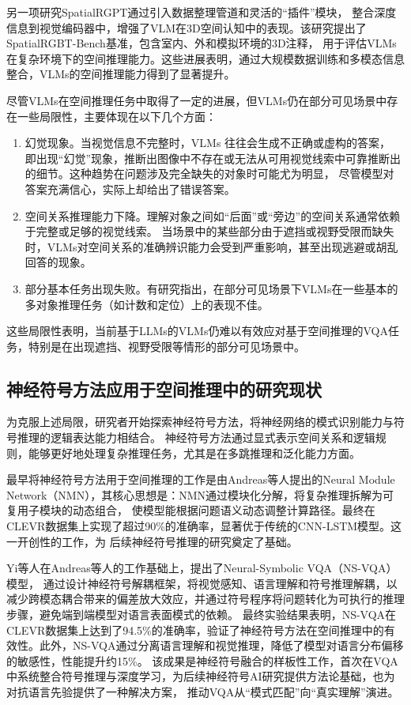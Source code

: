 另一项研究SpatialRGPT\cite{cheng2024spatialrgptgroundedspatialreasoning}通过引入数据整理管道和灵活的“插件”模块，
整合深度信息到视觉编码器中，增强了VLM在3D空间认知中的表现。该研究提出了SpatialRGBT-Bench基准，包含室内、外和模拟环境的3D注释，
用于评估VLMs在复杂环境下的空间推理能力。这些进展表明，通过大规模数据训练和多模态信息整合，VLMs的空间推理能力得到了显著提升。

尽管VLMs在空间推理任务中取得了一定的进展，但VLMs仍在部分可见场景中存在一些局限性，主要体现在以下几个方面：
\begin{enumerate}[nosep]
\item 幻觉现象。当视觉信息不完整时，VLMs 往往会生成不正确或虚构的答案，
即出现“幻觉”现象，推断出图像中不存在或无法从可用视觉线索中可靠推断出的细节。这种趋势在问题涉及完全缺失的对象时可能尤为明显，
尽管模型对答案充满信心，实际上却给出了错误答案\cite{vardi2025clipupclipbasedunanswerableproblem}。
\item 空间关系推理能力下降。理解对象之间如“后面”或“旁边”的空间关系通常依赖于完整或足够的视觉线索。
当场景中的某些部分由于遮挡或视野受限而缺失时，VLMs对空间关系的准确辨识能力会受到严重影响，甚至出现逃避或胡乱回答的现象\cite{chen2024spatialvlmendowingvisionlanguagemodels}。
\item 部分基本任务出现失败。有研究指出，在部分可见场景下VLMs在一些基本的多对象推理任务（如计数和定位）上的表现不佳\cite{campbell2024understandinglimitsvisionlanguage}。
\end{enumerate}

这些局限性表明，当前基于LLMs的VLMs仍难以有效应对基于空间推理的VQA任务，特别是在出现遮挡、视野受限等情形的部分可见场景中。
\subsection{神经符号方法应用于空间推理中的研究现状}
为克服上述局限，研究者开始探索神经符号方法，将神经网络的模式识别能力与符号推理的逻辑表达能力相结合。
神经符号方法通过显式表示空间关系和逻辑规则，能够更好地处理复杂推理任务，尤其是在多跳推理和泛化能力方面。

最早将神经符号方法用于空间推理的工作是由Andreas等人\cite{andreas2016neural}提出的Neural Module Network（NMN），其核心思想是：NMN通过模块化分解，将复杂推理拆解为可复用子模块的动态组合，
使模型能根据问题语义动态调整计算路径。最终在CLEVR数据集上实现了超过90\%的准确率，显著优于传统的CNN-LSTM模型。这一开创性的工作，为
后续神经符号推理的研究奠定了基础。

Yi等人\cite{yi2019neuralsymbolicvqadisentanglingreasoning}在Andreas等人的工作基础上，提出了Neural-Symbolic VQA（NS-VQA）模型，
通过设计神经符号解耦框架，将视觉感知、语言理解和符号推理解耦，以减少跨模态耦合带来的偏差放大效应，并通过符号程序将问题转化为可执行的推理步骤，避免端到端模型对语言表面模式的依赖。
最终实验结果表明，NS-VQA在CLEVR数据集上达到了94.5\%的准确率，验证了神经符号方法在空间推理中的有效性。此外，NS-VQA通过分离语言理解和视觉推理，降低了模型对语言分布偏移的敏感性，性能提升约15\%。
该成果是神经符号融合的样板性工作，首次在VQA中系统整合符号推理与深度学习，为后续神经符号AI研究提供方法论基础，也为对抗语言先验提供了一种解决方案，
推动VQA从“模式匹配”向“真实理解”演进。

